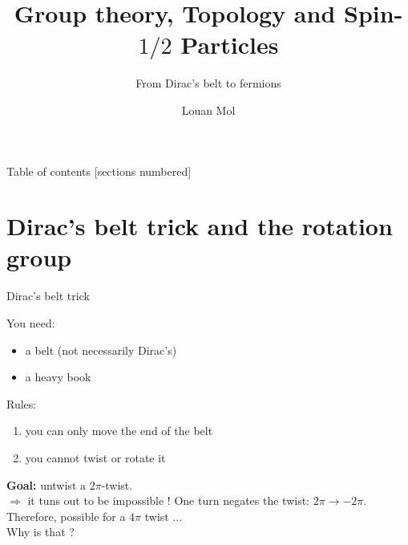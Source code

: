 \documentclass[8pt]{beamer}
\title{Group theory, Topology and Spin-$1/2$ Particles}
\subtitle{From Dirac's belt to fermions}
\date{}
\author{Louan Mol}
\institute{Unversité Libre de Bruxelles\\[2cm]{\small Brussels Summer School of Mathematics 2022}}
\renewcommand{\emph}{\alert}
\begin{document}
\maketitle

\nocite{*}

\begin{frame}{Table of contents}
    [sections numbered]
    \tableofcontents%
\end{frame}

\section{Dirac's belt trick and the rotation group}

\begin{frame}{Dirac's belt trick}
    
    You need:
    \begin{itemize}
        \item a belt (not necessarily Dirac's)
        \item a heavy book
    \end{itemize}
    Rules:
    \begin{enumerate}
        \item you can only move the end of the belt
        \item you cannot twist or rotate it
    \end{enumerate}
    \textbf{Goal:} untwist a $2\pi$-twist.\\[0.5cm]
    $\Rightarrow$ it tuns out to be \emph{impossible} ! One turn negates the twist: $2\pi\to-2\pi$. \\[0.5cm]

    Therefore, possible for a $4\pi$ twist ...\\ \hspace{7cm} Why is that ?

\end{frame}
\end{document}
